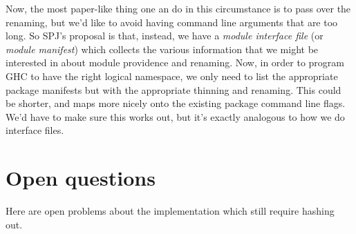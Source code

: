 \documentclass{article}
\begin{document}
Now, the most paper-like thing one an do in this circumstance is to pass
over the renaming, but we'd like to avoid having command line arguments
that are too long.  So SPJ's proposal is that, instead, we have a \emph{module
interface file} (or \emph{module manifest}) which collects the various information
that we might be interested in about module providence and renaming.  Now,
in order to program GHC to have the right logical namespace, we only need
to list the appropriate package manifests but with the appropriate thinning
and renaming.  This could be shorter, and maps more nicely onto the existing
package command line flags.  We'd have to make sure this works out, but it's
exactly analogous to how we do interface files.

\section{Open questions}\label{sec:open-questions}

Here are open problems about the implementation which still require
hashing out.
\end{document}
